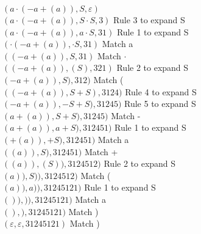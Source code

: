 \noindent $(a \cdot (-a +(a)), S, \varepsilon)$ \\
$(a \cdot (-a +(a)), S \cdot S, 3)$ Rule 3 to expand S \\
$(a \cdot (-a +(a)), a \cdot S, 31)$ Rule 1 to expand S \\
$(\cdot (-a +(a)), \cdot S, 31)$ Match a \\
$( (-a +(a)), S, 31)$ Match $\cdot$ \\
$( (-a +(a)), (S), 321)$ Rule 2 to expand S \\
$( -a +(a)), S), 312)$ Match ( \\
$((-a +(a)), S + S), 3124)$ Rule 4 to expand S \\
$(-a +(a)), -S + S), 31245)$ Rule 5 to expand S \\
$( a +(a)), S + S), 31245)$ Match -\\
$( a +(a)), a + S), 312451)$ Rule 1 to expand S\\
$( +(a)),  + S), 312451)$ Match a\\
$( (a)),  S), 312451)$ Match +\\
$( (a)),  (S)), 3124512)$ Rule 2 to expand S\\
$( a)),  S)), 3124512)$ Match (\\
$( a)),  a)), 31245121)$ Rule 1 to expand S\\
$( )),  )), 31245121)$ Match a\\
$( ),  ), 31245121)$ Match )\\
$( \varepsilon,  \varepsilon, 31245121)$ Match )\\

